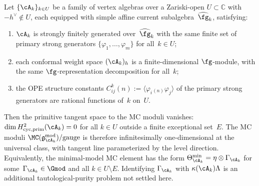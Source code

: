 \begin{theorem}
\label{thm:algebraic-family-rigidity}
Let $\{{\cA}_k\}_{k \in U}$ be a family of vertex algebras
over a Zariski-open $U \subset \mathbb{C}$ with
$-h^\vee \notin U$, each equipped with simple affine current
subalgebra~$\widehat{\fg}_k$, satisfying:
\begin{enumerate}[label=\textup{(\alph*)}]
\item ${\cA}_k$ is strongly finitely generated over~$\widehat{\fg}_k$
  with the same finite set of primary strong generators
  $\{\varphi_1, \ldots, \varphi_m\}$ for all~$k \in U$;
\item each conformal weight space $({\cA}_k)_h$ is a
  finite-dimensional $\fg$-module, with the same
  $\fg$-representation decomposition for all~$k$;
\item[\textup{(c$'$)}] the OPE structure constants
  $C^k_{ij}(n) := \langle \varphi_i{}_{(n)}\varphi_j \rangle$
  of the primary strong generators are rational functions
  of\/~$k$ on~$U$.
\end{enumerate}
Then the primitive tangent space to the MC moduli vanishes:
$\dim H^2_{\mathrm{cyc,prim}}({\cA}_k) = 0$ for all
$k \in U$ outside a finite exceptional set~$E$.
The MC moduli
$\MC(\mathfrak{g}_{{\cA}_k}^{\mathrm{mod}})/\mathrm{gauge}$
is therefore infinitesimally one-dimensional at the universal
class, with tangent line parameterized by the level direction.
Equivalently, the minimal-model MC element has the form
$\Theta_{{\cA}_k}^{\min} = \eta \otimes \Gamma_{{\cA}_k}$
for some\/~$\Gamma_{{\cA}_k}\in\Gmod$ and all
$k \in U \setminus E$.
Identifying $\Gamma_{{\cA}_k}$ with
$\kappa({\cA}_k)\Lambda$ is an additional tautological-purity
problem not settled here.
\end{theorem}

